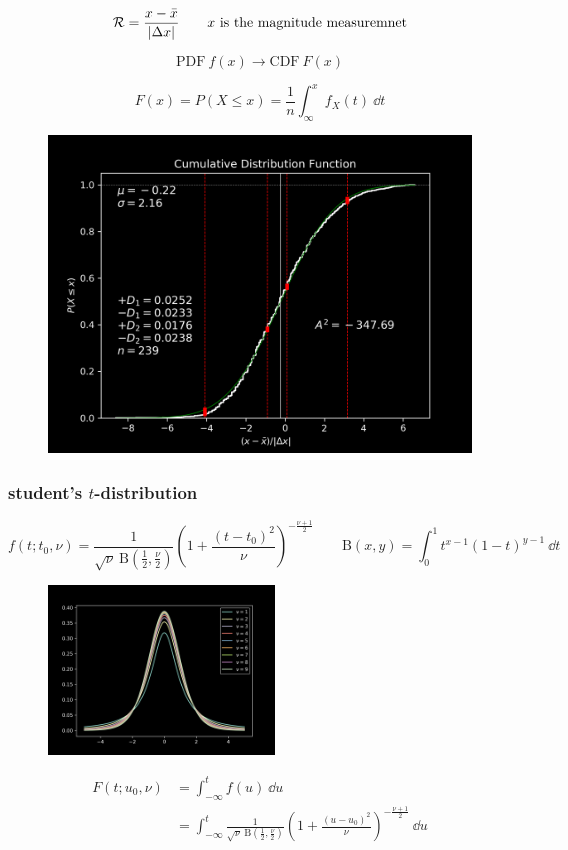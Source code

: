 \documentclass[9pt]{beamer}
\newcommand{\arr}{\ensuremath{\longrightarrow}}
\begin{document}
\begin{frame}
\[
\mathcal{R}
= \frac{x-\bar x}{\vqty{\Delta x}}
\qquad
\text{$x$ is the magnitude measuremnet}
\]

\[
\mathrm{PDF} \ f(x)
\arr \mathrm{CDF} \ F(x)
\]

\[
F(x) = P(X \leq x) = \frac{1}{n} \int _{\infty}^x f_X(t)\ \dd t
\]
\end{frame}


\begin{frame}
\begin{figure}[h]
\includegraphics[width=\textwidth]{cumu_dist}
\centering
\label{fig:cumu_dist}
\end{figure}
\end{frame}


\begin{frame}
\frametitle{student's $t$-distribution}
\[
f(t; t_0, \nu) = \frac{1}{\sqrt{\nu}\ \mathrm{B}(\frac12, \frac{\nu}{2})}
\left( 1+\frac{(t-t_0)^2}{\nu}\right)^{-\frac{\nu+1}{2}}
\qquad
\mathrm{B}(x,y) = \int_0^1t^{x-1}(1-t)^{y-1}\ \dd t
\]
\begin{figure}[h]
\centering
\includegraphics[width=6cm]{t_dist}
\label{fig:t_dist}
\end{figure}
\begin{equation*}
\begin{aligned}
F(t; u_0, \nu) &= \int_{-\infty}^tf(u)\ \dd u
\\&= \int_{-\infty}^t
\frac{1}{\sqrt{\nu}\ \mathrm{B}(\frac12, \frac{\nu}{2})}
\left( 1+\frac{(u-u_0)^2}{\nu}\right)^{-\frac{\nu+1}{2}}
\ \dd u
\end{aligned}
\end{equation*}
\end{frame}
\end{document}
